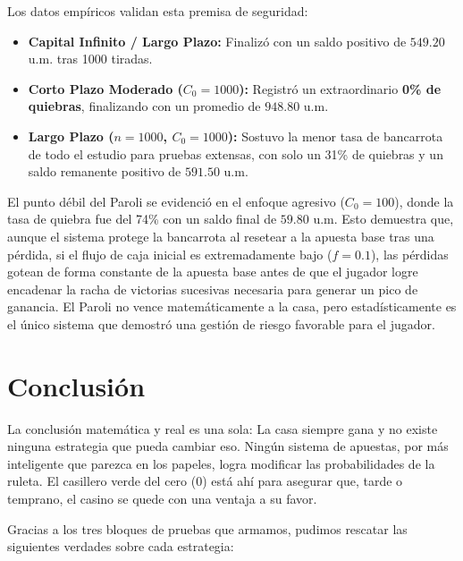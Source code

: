 \documentclass{article}
\begin{document}
Los datos empíricos validan esta premisa de seguridad:
\begin{itemize}
    \item \textbf{Capital Infinito / Largo Plazo:} Finalizó con un saldo positivo de $549.20$ u.m. tras 1000 tiradas.
    \item \textbf{Corto Plazo Moderado ($C_0 = 1000$):} Registró un extraordinario \textbf{0\% de quiebras}, finalizando con un promedio de $948.80$ u.m. 
    \item \textbf{Largo Plazo ($n = 1000$, $C_0 = 1000$):} Sostuvo la menor tasa de bancarrota de todo el estudio para pruebas extensas, con solo un 31\% de quiebras y un saldo remanente positivo de $591.50$ u.m.
\end{itemize}
El punto débil del Paroli se evidenció en el enfoque agresivo ($C_0 = 100$), donde la tasa de quiebra fue del 74\% con un saldo final de $59.80$ u.m. Esto demuestra que, aunque el sistema protege la bancarrota al resetear a la apuesta base tras una pérdida, si el flujo de caja inicial es extremadamente bajo ($f=0.1$), las pérdidas gotean de forma constante de la apuesta base antes de que el jugador logre encadenar la racha de victorias sucesivas necesaria para generar un pico de ganancia. El Paroli no vence matemáticamente a la casa, pero estadísticamente es el único sistema que demostró una gestión de riesgo favorable para el jugador.

\section{Conclusión}

La conclusión matemática y real es una sola: La casa siempre gana y no existe ninguna estrategia que pueda cambiar eso. Ningún sistema de apuestas, por más inteligente que parezca en los papeles, logra modificar las probabilidades de la ruleta. El casillero verde del cero ($0$) está ahí para asegurar que, tarde o temprano, el casino se quede con una ventaja a su favor.

Gracias a los tres bloques de pruebas que armamos, pudimos rescatar las siguientes verdades sobre cada estrategia:
\end{document}
